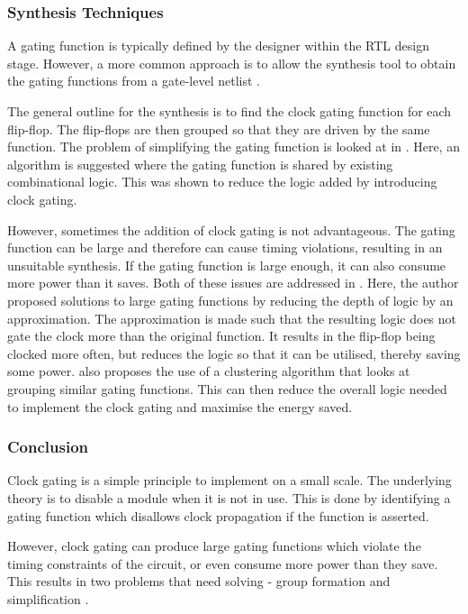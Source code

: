 \subsubsection{Synthesis Techniques}

A gating function is typically defined by the designer within the RTL design stage.
However, a more common approach is to allow the synthesis tool to obtain the gating functions from a gate-level netlist \cite{benini1999symbolic, hurst2008automatic}.

The general outline for the synthesis is to find the clock gating function for each flip-flop.
The flip-flops are then grouped so that they are driven by the same function. 
The problem of simplifying the gating function is looked at in \cite{han2012synthesis}. 
Here, an algorithm is suggested where the gating function is shared by existing combinational logic.
This was shown to reduce the logic added by introducing clock gating.

However, sometimes the addition of clock gating is not advantageous. 
The gating function can be large and therefore can cause timing violations, resulting in an unsuitable synthesis.
If the gating function is large enough, it can also consume more power than it saves.
Both of these issues are addressed in \cite{arbel2009resurrecting}.
Here, the author proposed solutions to large gating functions by reducing the depth of logic by an approximation. 
The approximation is made such that the resulting logic does not gate the clock more than the original function. 
It results in the flip-flop being clocked more often, but reduces the logic so that it can be utilised, thereby saving some power.
\cite{arbel2009resurrecting} also proposes the use of a clustering algorithm that looks at grouping similar gating functions. 
This can then reduce the overall logic needed to implement the clock gating and maximise the energy saved.

\subsubsection{Conclusion}

Clock gating is a simple principle to implement on a small scale.
The underlying theory is to disable a module when it is not in use.
This is done by identifying a gating function which disallows clock propagation if the function is asserted.

However, clock gating can produce large gating functions which violate the timing constraints of the circuit, or even consume more power than they save. This results in two problems that need solving - group formation and simplification \cite{han2012synthesis, paik2012clock}.







